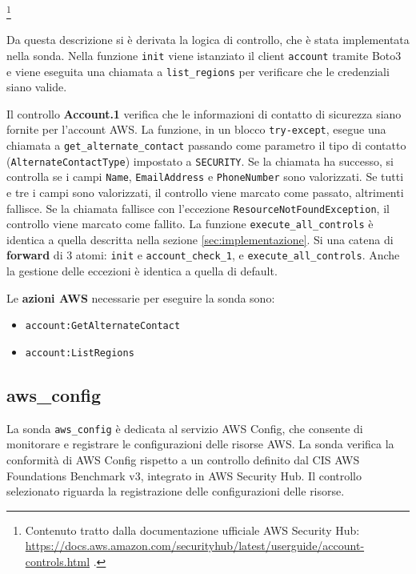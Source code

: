 \footnote{Contenuto tratto dalla documentazione ufficiale AWS Security Hub: \url{https://docs.aws.amazon.com/securityhub/latest/userguide/account-controls.html} .}

Da questa descrizione si è derivata la logica di controllo, che è stata implementata nella sonda. Nella funzione \texttt{init} viene istanziato il client \texttt{account} tramite Boto3 e viene eseguita una chiamata a \texttt{list\_regions} per verificare che le credenziali siano valide.

Il controllo \textbf{Account.1} verifica che le informazioni di contatto di sicurezza siano fornite per l'account AWS. La funzione, in un blocco \texttt{try-except}, esegue una chiamata a \texttt{get\_alternate\_contact} passando come parametro il tipo di contatto (\texttt{AlternateContactType}) impostato a \texttt{SECURITY}. Se la chiamata ha successo, si controlla se i campi \texttt{Name}, \texttt{EmailAddress} e \texttt{PhoneNumber} sono valorizzati. Se tutti e tre i campi sono valorizzati, il controllo viene marcato come passato, altrimenti fallisce. Se la chiamata fallisce con l'eccezione \texttt{ResourceNotFoundException}, il controllo viene marcato come fallito.
La funzione \texttt{execute\_all\_controls} è identica a quella descritta nella sezione \ref{sec:implementazione}. Si una catena di \textbf{forward} di 3 atomi: \texttt{init} e \texttt{account\_check\_1}, e \texttt{execute\_all\_controls}. Anche la gestione delle eccezioni è identica a quella di default.

\vspace{1em}

\noindent Le \textbf{azioni AWS} necessarie per eseguire la sonda sono:
\begin{itemize}
    \item \texttt{account:GetAlternateContact}
    \item \texttt{account:ListRegions}
\end{itemize}

\subsection{aws\_config}
\label{sec:config}

La sonda \texttt{aws\_config} è dedicata al servizio AWS Config, che consente di monitorare e registrare le configurazioni delle risorse AWS. La sonda verifica la conformità di AWS Config rispetto a un controllo definito dal CIS AWS Foundations Benchmark v3, integrato in AWS Security Hub. Il controllo selezionato riguarda la registrazione delle configurazioni delle risorse.

